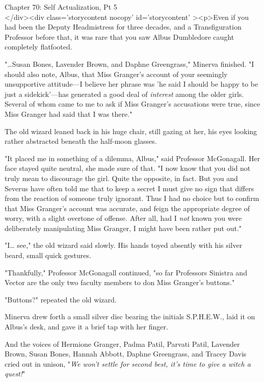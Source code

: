 
Chapter 70: Self Actualization, Pt 5\\
</div><div  class='storycontent nocopy' id='storycontent' ><p>Even if you had 
been the Deputy Headmistress for three decades, and a Transfiguration Professor 
before that, it was rare that you saw Albus Dumbledore caught completely 
flatfooted.

"{\ldots}Susan Bones, Lavender Brown, and Daphne Greengrass," Minerva finished. 
"I should also note, Albus, that Miss Granger's account of your seemingly 
unsupportive attitude---I believe her phrase was 'he said I should be happy to 
be just a sidekick'---has generated a good deal of \emph{interest} among the 
older girls. Several of whom came to me to ask if Miss Granger's accusations 
were true, since Miss Granger had said that I was there."

The old wizard leaned back in his huge chair, still gazing at her, his eyes 
looking rather abstracted beneath the half-moon glasses.

"It placed me in something of a dilemma, Albus," said Professor McGonagall. Her 
face stayed quite neutral, she made sure of that. "I now know that you did not 
truly mean to discourage the girl. Quite the opposite, in fact. But you and 
Severus have often told me that to keep a secret I must give no sign that 
differs from the reaction of someone truly ignorant. Thus I had no choice but 
to confirm that Miss Granger's account was accurate, and feign the appropriate 
degree of worry, with a slight overtone of offense. After all, had I \emph{not} 
known you were deliberately manipulating Miss Granger, I might have been rather 
put out."

"I{\ldots} see," the old wizard said slowly. His hands toyed absently with his 
silver beard, small quick gestures.

"Thankfully," Professor McGonagall continued, "so far Professors Sinistra and 
Vector are the only two faculty members to don Miss Granger's buttons."

"Buttons?" repeated the old wizard.

Minerva drew forth a small silver disc bearing the initials S.P.H.E.W., laid it 
on Albus's desk, and gave it a brief tap with her finger.

And the voices of Hermione Granger, Padma Patil, Parvati Patil, Lavender Brown, 
Susan Bones, Hannah Abbott, Daphne Greengrass, and Tracey Davis cried out in 
unison, "\emph{We won't settle for second best, it's time to give a witch a 
quest!}"

